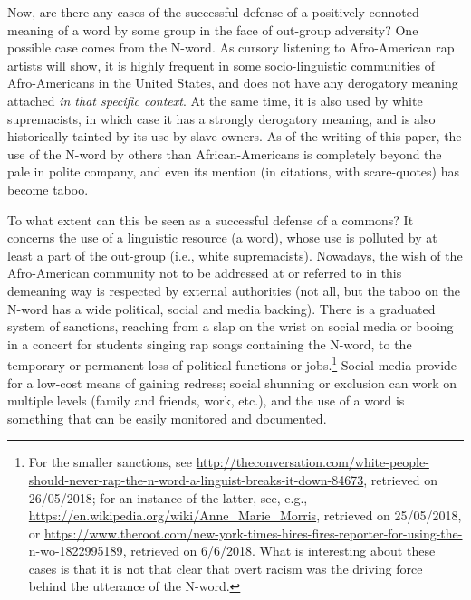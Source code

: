 \documentclass[output=paper,hidelinks]{langscibook}
\begin{document}
%
%

Now, are there any cases of the successful defense of a positively connoted meaning of a word by some group in the face of out-group adversity? One possible case
comes from the N-word. As cursory listening to Afro-American rap artists will show, it is highly frequent in some socio-linguistic communities of Afro-Americans in the United States, and does not have any derogatory meaning attached \emph{in that specific context}. At the same time, it is also used by white supremacists, in which case it has a strongly derogatory meaning, and is also historically tainted by its  use by slave-owners. As of the writing of this paper, the use of the N-word by others than African-Americans is completely beyond the pale in polite company, and even its mention (in citations, with scare-quotes) has become taboo.

To what extent can this be seen as a successful defense of a commons? It concerns the use of a linguistic resource (a word), whose use is polluted by at least a part of the out-group (i.e., white supremacists). Nowadays, the wish of the Afro-American community not to be addressed at or referred to in this demeaning way is respected by external authorities (not all, but the taboo on the N-word has a wide political, social and media backing). There is a graduated system of sanctions, reaching from a slap on the wrist on social media or booing in a concert for  students singing rap songs containing the N-word, to the temporary or permanent loss of political functions or jobs.\footnote{For the smaller sanctions, see \url{http://theconversation.com/white-people-should-never-rap-the-n-word-a-linguist-breaks-it-down-84673}, retrieved on 26/05/2018; for an instance of the latter, see, e.g., \url{https://en.wikipedia.org/wiki/Anne_Marie_Morris}, retrieved on 25/05/2018, or \url{https://www.theroot.com/new-york-times-hires-fires-reporter-for-using-the-n-wo-1822995189}, retrieved on 6/6/2018. What is interesting about these cases is that it is not that clear that overt racism was the driving force behind the utterance of the N-word.}
Social media provide for a low-cost means of gaining redress; social shunning or exclusion can work on multiple levels (family and friends, work, etc.), and the use of a word is something that can be easily monitored and documented.
\end{document}
